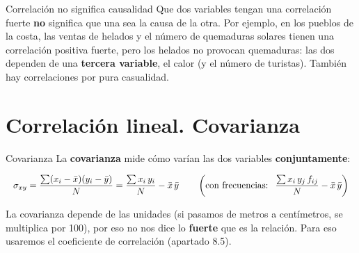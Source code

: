 \documentclass[11pt,a4paper]{article}
\makeatletter
\newcommand{\lt}{<}\newcommand{\gt}{>}
\newcommand{\fmm}[1]{\setbox0=\hbox{$#1$}\ifdim\wd0>0.8\linewidth\def\fmmnext{\fmmdisp{#1}}\else\def\fmmnext{\mbox{\box0}}\fi\fmmnext}
\def\fmmdisp#1{\@ifnextchar.{\fmmdispp{#1}}{\@ifnextchar,{\fmmdispc{#1}}{\@ifnextchar;{\fmmdisps{#1}}{\fmdisp{#1}}}}}
\def\fmmdispp#1.{\fmdisp{#1\,.}}\def\fmmdispc#1,{\fmdisp{#1\,,}}\def\fmmdisps#1;{\fmdisp{#1\,;}}
\newcommand{\fmdisp}[1]{\[\setbox2=\hbox{$\displaystyle #1$}\ifdim\wd2>\linewidth\resizebox{\linewidth}{!}{\box2}\else\box2\fi\]}
\makeatother
\begin{document}
\begin{fmprop}{Correlación no significa causalidad}
Que dos variables tengan una correlación fuerte \textbf{no} significa que una sea la causa de la otra. Por ejemplo, en los pueblos de la costa, las ventas de helados y el número de quemaduras solares tienen una correlación positiva fuerte, pero los helados no provocan quemaduras: las dos dependen de una \textbf{tercera variable}, el calor (y el número de turistas). También hay correlaciones por pura casualidad.
\end{fmprop}

\Needspace{5.7cm}
\section{Correlación lineal. Covarianza}\hypertarget{sec4}{}

\begin{fmprop}{Covarianza}
La \textbf{covarianza} mide cómo varían las dos variables \textbf{conjuntamente}:

\fmdisp{\sigma_{xy}=\frac{\sum(x_i-\bar x)(y_i-\bar y)}{N}=\frac{\sum x_i\,y_i}{N}-\bar x\,\bar y\qquad\left(\text{con frecuencias: }\ \frac{\sum x_i\,y_j\,f_{ij}}{N}-\bar x\,\bar y\right)}


\begin{fmnote}La covarianza depende de las unidades (si pasamos de metros a centímetros, se multiplica por 100), por eso no nos dice lo \textbf{fuerte} que es la relación. Para eso usaremos el coeficiente de correlación (apartado 8.5).\end{fmnote}
\end{fmprop}
\end{document}
